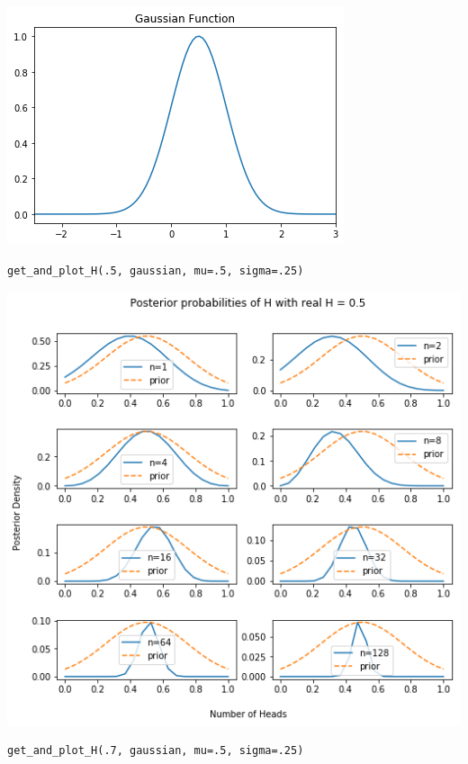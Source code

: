 \documentclass[11pt]{article}
\begin{document}
\includegraphics[width=.9\linewidth]{./obipy-resources/322EcM.png}

\begin{verbatim}
get_and_plot_H(.5, gaussian, mu=.5, sigma=.25)
\end{verbatim}

\includegraphics[width=.9\linewidth]{./obipy-resources/322rzq.png}

\begin{verbatim}
get_and_plot_H(.7, gaussian, mu=.5, sigma=.25)
\end{verbatim}
\end{document}
